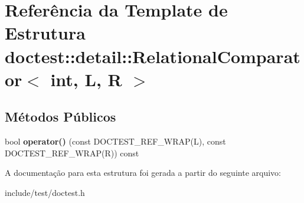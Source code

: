 \hypertarget{structdoctest_1_1detail_1_1RelationalComparator}{}\section{Referência da Template de Estrutura doctest\+:\+:detail\+:\+:Relational\+Comparator$<$ int, L, R $>$}
\label{structdoctest_1_1detail_1_1RelationalComparator}
\subsection*{Métodos Públicos}
\begin{DoxyCompactItemize}
\item 
\mbox{\label{structdoctest_1_1detail_1_1RelationalComparator_a51062ad46cd23c982838a0a51df70512}} 
bool {\bfseries operator()} (const D\+O\+C\+T\+E\+S\+T\+\_\+\+R\+E\+F\+\_\+\+W\+R\+AP(L), const D\+O\+C\+T\+E\+S\+T\+\_\+\+R\+E\+F\+\_\+\+W\+R\+AP(R)) const
\end{DoxyCompactItemize}


A documentação para esta estrutura foi gerada a partir do seguinte arquivo\+:\begin{DoxyCompactItemize}
\item 
include/test/doctest.\+h\end{DoxyCompactItemize}
